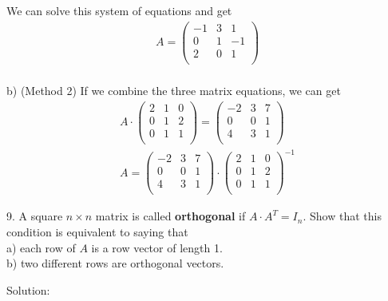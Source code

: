 \documentclass{article}
\begin{document}
We can solve this system of equations and get
\begin{gather*}
  A = \begin{pmatrix}
        -1 & 3 & 1 \\
        0 & 1 & -1 \\
        2 & 0 & 1 \\ 
      \end{pmatrix} \\
\end{gather*}

b) (Method 2) 
If we combine the three matrix equations, we can get
\begin{gather*}
  A \cdot \begin{pmatrix}
            2 & 1 & 0 \\
            0 & 1 & 2 \\
            0 & 1 & 1 \\
          \end{pmatrix} =
  \begin{pmatrix}
    -2 & 3 & 7 \\
    0 & 0 & 1 \\
    4 & 3 & 1 \\
  \end{pmatrix} \\
  A = \begin{pmatrix}
        -2 & 3 & 7 \\
        0 & 0 & 1 \\
        4 & 3 & 1 \\ 
      \end{pmatrix} \cdot
      \begin{pmatrix}
        2 & 1 & 0 \\
        0 & 1 & 2 \\
        0 & 1 & 1 \\
      \end{pmatrix}^{-1}
\end{gather*}

9. A square $n \times n$ matrix is called \textbf{orthogonal} if 
$A \cdot A^T = I_n$. Show that this condition is equivalent to saying that \\
a) each row of $A$ is a row vector of length 1. \\
b) two different rows are orthogonal vectors.

Solution:
\end{document}
